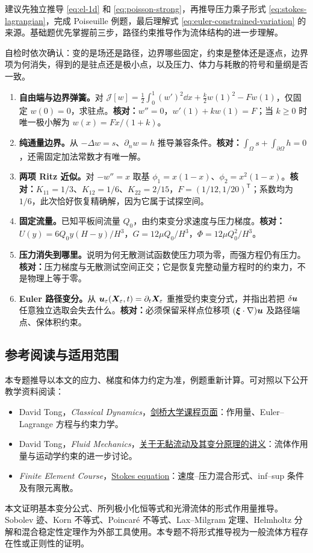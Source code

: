 建议先独立推导 \eqref{eq:el-1d} 和 \eqref{eq:poisson-strong}，再推导压力乘子形式 \eqref{eq:stokes-lagrangian}，完成 Poiseuille 例题，最后理解式 \eqref{eq:euler-constrained-variation} 的来源。基础题优先掌握前三步，路径约束推导作为流体结构的进一步理解。

自检时依次确认：变的是场还是路径，边界哪些固定，约束是整体还是逐点，边界项为何消失，得到的是驻点还是极小点，以及压力、体力与耗散的符号和量纲是否一致。

\begin{enumerate}
 \item \textbf{自由端与边界弹簧。}对 $\mathcal J[w]=\frac12\int_0^1(w')^2\dd x+\frac k2w(1)^2-Fw(1)$，仅固定 $w(0)=0$，求驻点。\textbf{核对：}$w''=0$，$w'(1)+kw(1)=F$；当 $k\ge0$ 时唯一极小解为 $w(x)=Fx/(1+k)$。
 \item \textbf{纯通量边界。}从 $-\Delta w=s$、$\partial_nw=h$ 推导兼容条件。\textbf{核对：}$\int_\Omega s+\int_{\partial\Omega}h=0$，还需固定加法常数才有唯一解。
 \item \textbf{两项 Ritz 近似。}对 $-w''=x$ 取基 $\phi_1=x(1-x)$、$\phi_2=x^2(1-x)$。\textbf{核对：}$K_{11}=1/3$、$K_{12}=1/6$、$K_{22}=2/15$，$F=(1/12,1/20)^{\mathsf T}$；系数均为 $1/6$，此次恰好恢复精确解，因为它属于试探空间。
 \item \textbf{固定流量。}已知平板间流量 $Q_0$，由约束变分求速度与压力梯度。\textbf{核对：}$U(y)=6Q_0y(H-y)/H^3$，$G=12\mu Q_0/H^3$，$\Phi=12\mu Q_0^2/H^3$。
 \item \textbf{压力消失到哪里。}说明为何无散测试函数使压力项为零，而强方程仍有压力。\textbf{核对：}压力梯度与无散测试空间正交；它是恢复完整动量方程时的约束力，不是物理上等于零。
 \item \textbf{Euler 路径变分。}从 $\bm{u}_\varepsilon(\bm{X}_\varepsilon,t)=\partial_t\bm{X}_\varepsilon$ 重推受约束变分式，并指出若把 $\delta\bm{u}$ 任意独立选取会失去什么。\textbf{核对：}必须保留采样点位移项 $(\bm{\xi}\cdot\nabla)\bm{u}$ 及路径端点、保体积约束。
\end{enumerate}

\subsection{参考阅读与适用范围}

本专题推导以本文的应力、梯度和体力约定为准，例题重新计算。可对照以下公开教学资料阅读：
\begin{itemize}
 \item David Tong，\emph{Classical Dynamics}，\href{https://www.damtp.cam.ac.uk/user/tong/dynamics.html}{剑桥大学课程页面}：作用量、Euler--Lagrange 方程与约束力学。
 \item David Tong，\emph{Fluid Mechanics}，\href{https://www.damtp.cam.ac.uk/user/tong/fluids/fluids1.pdf}{关于无黏流动及其变分原理的讲义}：流体作用量与运动学约束的进一步讨论。
 \item \emph{Finite Element Course}，\href{https://finite-element.github.io/L6_stokes.html}{Stokes equation}：速度--压力混合形式、inf--sup 条件及有限元离散。
\end{itemize}
本文证明基本变分公式、所列极小化恒等式和光滑流体的形式作用量推导。Sobolev 迹、Korn 不等式、Poincar\'e 不等式、Lax--Milgram 定理、Helmholtz 分解和混合稳定性定理作为外部工具使用。本专题不将形式推导视为一般流体方程存在性或正则性的证明。
